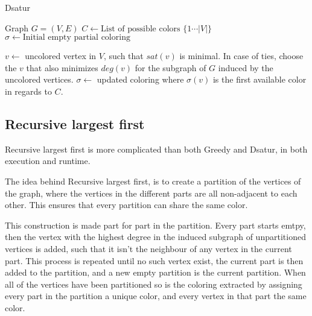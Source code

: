 \documentclass{amsart}
\begin{document}
\begin{algorithm}[H]
  \caption{Dsatur}
  \begin{algorithmic}[1]
      \REQUIRE Graph $G = (V,E)$
      \STATE $C \leftarrow \text{List of possible colors $\{1 \cdots |V| \}$ }$
      \STATE $\sigma \leftarrow \text{Initial empty partial coloring}$


        \STATE $v \leftarrow$ uncolored vertex in $V$, such that $sat(v)$ is
        minimal. In case of ties, choose the $v$ that also minimizes $deg(v)$
        for the subgraph of $G$ induced by the uncolored vertices.
        \STATE $\sigma \leftarrow$ updated coloring where $\sigma(v)$ is the first
        available color in regards to $C$.
      \ENDFOR
  \end{algorithmic}
\end{algorithm}

\subsection{Recursive largest first}

Recursive largest first is more complicated than both Greedy and Dsatur, in both
execution and runtime. 

The idea behind Recursive largest first, is to create a partition of the
vertices of the graph, where the vertices in the different parts are all
non-adjacent to each other. This ensures that every partition can share the
same color. 

This construction is made part for part in the partition.  Every part starts
emtpy, then the vertex with the highest degree in the induced subgraph of
unpartitioned vertices is added, such that it isn't the neighbour of any vertex
in the current part.  This process is repeated until no such vertex exist, the
current part is then added to the partition, and a new empty partition is the
current partition. When all of the vertices have been partitioned so is the
coloring extracted by assigning every part in the partition a unique color, and
every vertex in that part the same color.
\end{document}

